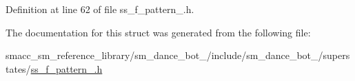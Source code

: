 Definition at line 62 of file ss\+\_\+f\+\_\+pattern\+\_.\+h.



The documentation for this struct was generated from the following file\+:\begin{DoxyCompactItemize}
\item 
smacc\+\_\+sm\+\_\+reference\+\_\+library/sm\+\_\+dance\+\_\+bot\+\_/include/sm\+\_\+dance\+\_\+bot\+\_/superstates/\hyperlink{3_2include_2sm__dance__bot__3_2superstates_2ss__f__pattern__1_8h}{ss\+\_\+f\+\_\+pattern\+\_.\+h}\end{DoxyCompactItemize}
